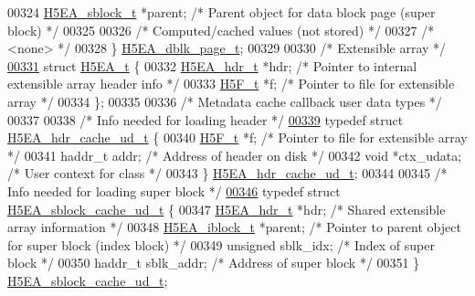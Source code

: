 \begin{DoxyCode}
00324     \hyperlink{struct_h5_e_a__sblock__t}{H5EA\_sblock\_t} *parent;      \textcolor{comment}{/* Parent object for data block page (super block)  */}
00325 
00326     \textcolor{comment}{/* Computed/cached values (not stored) */}
00327     \textcolor{comment}{/* <none> */}
00328 \} \hyperlink{struct_h5_e_a__dbk__page__t}{H5EA\_dblk\_page\_t};
00329 
00330 \textcolor{comment}{/* Extensible array */}
\hyperlink{struct_h5_e_a__t}{00331} \textcolor{keyword}{struct }\hyperlink{struct_h5_e_a__t}{H5EA\_t} \{
00332     \hyperlink{struct_h5_e_a__hdr__t}{H5EA\_hdr\_t}  *hdr;           \textcolor{comment}{/* Pointer to internal extensible array header info */}
00333     \hyperlink{struct_h5_f__t}{H5F\_t}      *f;              \textcolor{comment}{/* Pointer to file for extensible array */}
00334 \};
00335 
00336 \textcolor{comment}{/* Metadata cache callback user data types */}
00337 
00338 \textcolor{comment}{/* Info needed for loading header */}
\hyperlink{struct_h5_e_a__hdr__cache__ud__t}{00339} \textcolor{keyword}{typedef} \textcolor{keyword}{struct }\hyperlink{struct_h5_e_a__hdr__cache__ud__t}{H5EA\_hdr\_cache\_ud\_t} \{
00340     \hyperlink{struct_h5_f__t}{H5F\_t}      *f;              \textcolor{comment}{/* Pointer to file for extensible array */}
00341     haddr\_t    addr;            \textcolor{comment}{/* Address of header on disk */}
00342     \textcolor{keywordtype}{void}       *ctx\_udata;      \textcolor{comment}{/* User context for class */}
00343 \} \hyperlink{struct_h5_e_a__hdr__cache__ud__t}{H5EA\_hdr\_cache\_ud\_t};
00344 
00345 \textcolor{comment}{/* Info needed for loading super block */}
\hyperlink{struct_h5_e_a__sblock__cache__ud__t}{00346} \textcolor{keyword}{typedef} \textcolor{keyword}{struct }\hyperlink{struct_h5_e_a__sblock__cache__ud__t}{H5EA\_sblock\_cache\_ud\_t} \{
00347     \hyperlink{struct_h5_e_a__hdr__t}{H5EA\_hdr\_t}    *hdr;         \textcolor{comment}{/* Shared extensible array information */}
00348     \hyperlink{struct_h5_e_a__iblock__t}{H5EA\_iblock\_t} *parent;      \textcolor{comment}{/* Pointer to parent object for super block (index block) */}
00349     \textcolor{keywordtype}{unsigned} sblk\_idx;          \textcolor{comment}{/* Index of super block */}
00350     haddr\_t sblk\_addr;          \textcolor{comment}{/* Address of super block */}
00351 \} \hyperlink{struct_h5_e_a__sblock__cache__ud__t}{H5EA\_sblock\_cache\_ud\_t};

\end{DoxyCode}

